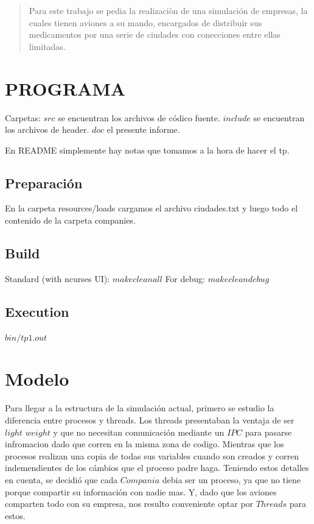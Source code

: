 \documentclass[a4paper,12pt,spanish]{article} %
\begin{document}
	
\maketitle
\newpage

\setcounter{page}{1} %
\tableofcontents
\newpage

\begin{abstract}

Para este trabajo se pedia la realizaciòn de una simulación de empresas, la cuales tienen aviones a su mando, encargados de distribuir sus medicamentos por una serie de ciudades con conecciones entre ellas limitadas.

\end{abstract}

\section{PROGRAMA}
Carpetas:
$src$ se encuentran los archivos de códico fuente.
$include$ se encuentran los archivos de header.
$doc$ el presente informe.

En README simplemente hay notas que tomamos a la hora de hacer el tp.

\subsection{Preparación}
En la carpeta resources/loads cargamos el archivo ciudades.txt y luego todo el contenido de la carpeta companies.
\subsection{Build}
Standard (with ncurses UI): $make clean all$
For debug: $make clean debug$
\subsection{Execution}
$bin/tp1.out$
\section{Modelo}

Para llegar a la estructura de la simulación actual, primero se estudio
la diferencia entre procesos y threads. Los threads presentaban la
ventaja de ser $light$ $weight$ y que no necesitan comunicación
mediante un $IPC$ para pasarse infromacion dado que corren en la
misma zona de codigo. Mientras que los procesos realizan una copia
de todas sus variables cuando son creados y corren indemendientes
de los cámbios que el proceso padre haga. Teniendo estos detalles
en cuenta, se decidió que cada $Compania$ debia ser un proceso, ya
que no tiene porque compartir su información con nadie mas. Y, dado
que los aviones comparten todo con su empresa, nos resulto conveniente
optar por $Threads$ para estos.
\end{document}
